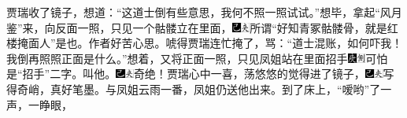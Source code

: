 贾瑞收了镜子，想道：“这道士倒有些意思，我何不照一照试试。”想毕，拿起“风月鉴”来，向反面一照，只见一个骷髅立在里面，{\includegraphics[width=3mm]{../Images/00003}\includegraphics[width=3mm]{../Images/00012}\footnotesize \kaishu 所谓“好知青冢骷髅骨，就是红楼掩面人”是也。作者好苦心思。}唬得贾瑞连忙掩了，骂：“道士混账，如何吓我！我倒再照照正面是什么。”想着，又将正面一照，只见凤姐站在里面招手{\includegraphics[width=3mm]{../Images/00004}\includegraphics[width=3mm]{../Images/00011}\footnotesize \kaishu 可怕是“招手”二字。}叫他。{\includegraphics[width=3mm]{../Images/00003}\includegraphics[width=3mm]{../Images/00012}\footnotesize \kaishu 奇绝！}贾瑞心中一喜，荡悠悠的觉得进了镜子，{\includegraphics[width=3mm]{../Images/00003}\includegraphics[width=3mm]{../Images/00012}\footnotesize \kaishu 写得奇峭，真好笔墨。}与凤姐云雨一番，凤姐仍送他出来。到了床上，“嗳哟”了一声，一睁眼，
